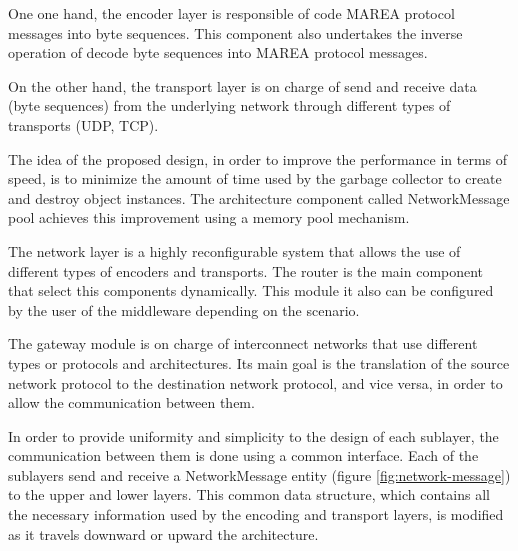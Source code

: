 One one hand, the encoder layer is responsible of code MAREA protocol messages into byte sequences. This component also undertakes the inverse operation of decode byte sequences into MAREA protocol messages. 

On the other hand, the transport layer is on charge of send and receive data (byte sequences) from the underlying network through different types of transports (UDP, TCP).

The idea of the proposed design, in order to improve the performance in terms of speed,  is to minimize the amount of time used by the garbage collector to create and destroy object instances.  The architecture component called NetworkMessage pool achieves this improvement using a memory pool mechanism.

The network layer is a highly reconfigurable system that allows the use of different types of encoders and transports. The router is the main component that select this components dynamically. This module it also can be configured by the user of the middleware depending on the scenario.  

The gateway module is on charge of interconnect networks that use different types or protocols and architectures. Its main goal is the translation of the source network protocol to the destination network protocol, and vice versa, in order to allow the communication between them.

In order to provide uniformity and simplicity to the design of each sublayer, the communication between them is done using a common interface. Each of the sublayers send and receive a NetworkMessage entity (figure \ref{fig:network-message}) to the upper and lower layers. This common data structure, which contains all the necessary information used by the encoding and transport layers, is modified as it travels downward or upward the architecture. 

